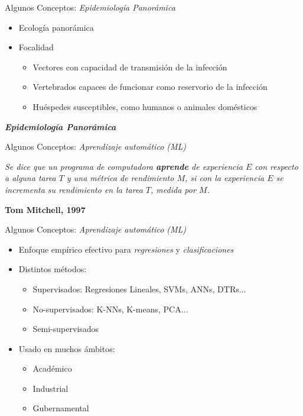 \documentclass[10pt]{beamer}
\begin{document}
\begin{frame}{Algunos Conceptos: \textit{Epidemiología Panorámica}}
  \begin{itemize}[<+->]
   \item Ecología panorámica
   \item Focalidad
    \begin{itemize}
      \item Vectores con capacidad de transmisión de la infección
      \item Vertebrados capaces de funcionar como reservorio de la infección
      \item Huéspedes susceptibles, como humanos o animales domésticos
    \end{itemize}
    \pause
  \end{itemize}
  \begin{center}
    \textbf{\textit{Epidemiología Panorámica}}
  \end{center}
\end{frame}


\begin{frame}{Algunos Conceptos: \textit{Aprendizaje automático (ML)}}
  \begin{framed}
    \begin{center}
      \textit{Se dice que un programa de computadora \textbf{aprende} de experiencia
      $E$ con respecto a alguna tarea $T$ y una métrica de rendimiento $M$, si
      con la experiencia $E$ se incrementa su rendimiento en la tarea $T$,
      medida por $M$.}\\
    \end{center}
    \centering \textbf{Tom Mitchell, 1997}
  \end{framed}

\end{frame}



\begin{frame}{Algunos Conceptos: \textit{Aprendizaje automático (ML)}}
\begin{itemize}[<+->]
  \item Enfoque empírico efectivo para \textit{regresiones} y \textit{clasificaciones}
  \item Distintos métodos:
    \begin{itemize}
      \item Supervisados: Regresiones Lineales, SVMs, ANNs, DTRs...
      \item No-supervisados: K-NNs, K-means, PCA...
      \item Semi-supervisados
    \end{itemize}
  \item Usado en muchos ámbitos:
  \begin{itemize}
    \item Académico
    \item Industrial
    \item Gubernamental
  \end{itemize}

\end{itemize}
\end{frame}
\end{document}
